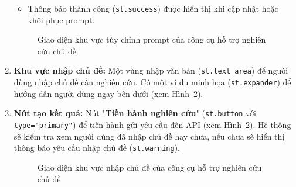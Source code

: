 \begin{enumerate}
\begin{itemize}
        \item Thông báo thành công (\texttt{st.success}) được hiển thị khi cập nhật hoặc khôi phục prompt.  
    \end{itemize}
    \vspace*{-10pt}
    \begin{figure}[H]
        \centering
        \caption{Giao diện khu vực tùy chỉnh prompt của công cụ hỗ trợ nghiên cứu chủ đề}
        \label{fig:research_prompt_area}
    \end{figure}
    \vspace*{-16pt}

    \item \textbf{Khu vực nhập chủ đề:} Một vùng nhập văn bản (\texttt{st.text\_area}) để người dùng nhập chủ đề cần nghiên cứu. Có một ví dụ minh họa (\texttt{st.expander}) để hướng dẫn người dùng ngay bên dưới (xem Hình~\ref{fig:research_topic_area}).
    
    \item \textbf{Nút tạo kết quả:} Nút "\textbf{Tiến hành nghiên cứu}" (\texttt{st.button} với \texttt{type="primary"}) để tiến hành gửi yêu cầu đến API (xem Hình~\ref{fig:research_topic_area}). Hệ thống sẽ kiểm tra xem người dùng đã nhập chủ đề hay chưa, nếu chưa sẽ hiển thị thông báo yêu cầu nhập chủ đề (\texttt{st.warning}).
    \vspace*{-4pt}
    \begin{figure}[H]
        \centering
        \caption{Giao diện khu vực nhập chủ đề của công cụ hỗ trợ nghiên cứu chủ đề}
        \label{fig:research_topic_area}
    \end{figure}
    

\end{enumerate}
